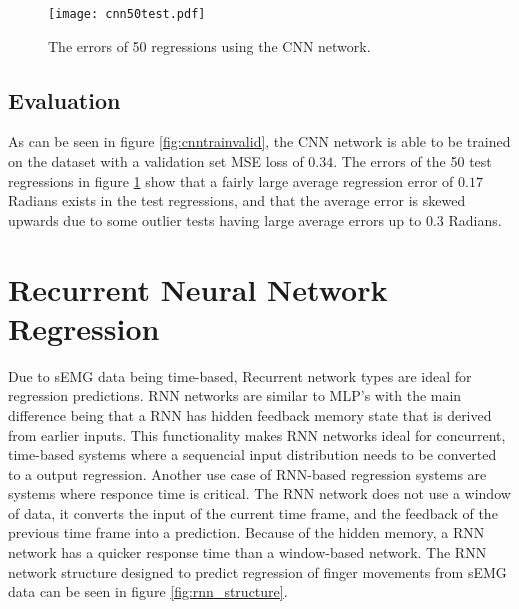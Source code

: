 \documentclass[../main.tex]{subfiles}
\begin{document}
\begin{figure}[H]
\begin{center}
\texttt{[image: cnn50test.pdf]}
\caption{The errors of 50 regressions using the CNN network.}
\label{fig:cnntest}
\end{center}
\end{figure}


\subsection{Evaluation}

As can be seen in figure \ref{fig:cnntrainvalid}, the CNN network is able to be trained on the dataset with a validation set MSE loss of $0.34$.
The errors of the 50 test regressions in figure \ref{fig:cnntest} show that a fairly large average regression error of $0.17$ Radians exists in the test regressions, and that the average error is skewed upwards due to some outlier tests having large average errors up to $0.3$ Radians.



\section{Recurrent Neural Network Regression}

Due to sEMG data being time-based, Recurrent network types are ideal for regression predictions.
RNN networks are similar to MLP's with the main difference being that a RNN has hidden feedback  memory state that is derived from earlier inputs.
This functionality makes RNN networks ideal for concurrent, time-based systems where a sequencial input distribution needs to be converted to a output regression.  
Another use case of RNN-based regression systems are systems where responce time is critical.
The RNN network does not use a window of data, it converts the input of the current time frame, and the feedback of the previous time frame into a prediction.
Because of the hidden memory, a RNN network has a quicker response time than a window-based network.
The RNN network structure designed to predict regression of finger movements from sEMG data can be seen in figure \ref{fig:rnn_structure}.
\end{document}
